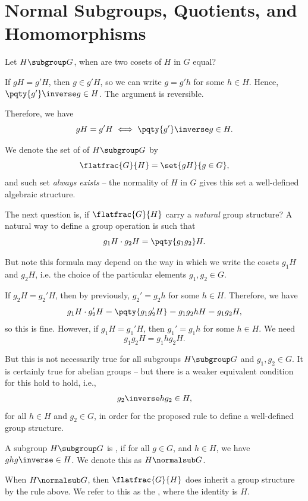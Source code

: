 \section{Normal Subgroups, Quotients, and Homomorphisms}

Let \(H \subgroup G\), when are two cosets of \(H\) in \(G\) equal?

If \(gH = g' H\), then \(g \in g' H\), so we can write \(g = g' h\) for some \(h \in H\). Hence, \(\pqty{g'}\inverse g \in H\). The argument is reversible.

Therefore, we have
\[
    gH = g' H \iff \pqty{g'}\inverse g \in H.
\]

We denote the set of  of \(H \subgroup G\) by
\[
    \flatfrac{G}{H} = \set{gH}{g \in G},
\]
and such set \emph{always exists} -- the normality of \(H\) in \(G\) gives this set a well-defined algebraic structure.

The next question is, if \(\flatfrac{G}{H}\) carry a \emph{natural} group structure? A natural way to define a group operation is such that
\[
    g_1 H \cdot g_2 H = \pqty{g_1 g_2} H.
\]

But note this formula may depend on the way in which we write the cosets \(g_1 H\) and \(g_2 H\), i.e. the choice of the particular elements \(g_1, g_2 \in G\).

If \(g_2 H = g_2' H\), then by previously, \(g_2' = g_2 h\) for some \(h \in H\). Therefore, we have
\[
    g_1 H \cdot g_2' H = \pqty{g_1 g_2' H} = g_1 g_2 h H = g_1 g_2 H,
\]
so this is fine. However, if \(g_1 H = g_1' H\), then \(g_1' = g_1 h\) for some \(h \in H\). We need
\[
    g_1 g_2 H = g_1 h g_2 H.
\]

But this is not necessarily true for all subgroups \(H \subgroup G\) and \(g_1, g_2 \in G\). It is certainly true for abelian groups -- but there is a weaker equivalent condition for this hold to hold, i.e.,
\[
    g_2 \inverse h g_2 \in H,
\]
for all \(h \in H\) and \(g_2 \in G\), in order for the proposed rule to define a well-defined group structure.

\begin{definition}[Normality]
    \label{def:normality}%
    A subgroup \(H \subgroup G\) is , if for all \(g \in G\), and \(h \in H\), we have \(g h g \inverse \in H\). We denote this as \(H \normalsub G\).
\end{definition}

\begin{definition}
    \label{def:quotient-group}%
    When \(H \normalsub G\), then \(\flatfrac{G}{H}\) does inherit a group structure by the rule above. We refer to this as the , where the identity is \(H\).
\end{definition}

